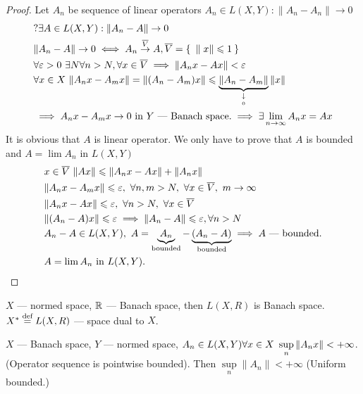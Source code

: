 \begin{proof}
  Let $A_n$ be sequence of linear operators $A_n \in L(X, Y): \|A_n - A_n\| \to 0$
  \begin{align*}
    &?\exists A \in L(X, Y): \|A_n - A\| \to 0 \\
    &\|A_n - A\| \to 0 \iff A_n \overset{\overline{V}}{\rightarrow} A, \overline{V} = \Set{\|x\| \leq
      1}\ \\ 
    &\forall \epsilon > 0\ \exists N \forall n > N, \forall x \in \overline{V}
      \implies \|A_nx - Ax\| < \epsilon \\
    &\forall x \in X\ \|A_nx - A_mx\| = \|(A_n - A_m)x\| \leq \tendsto{\|A_n - A_m\|}{0} \|x\| \\
    & \implies A_nx - A_mx \to 0\ \text{in}\ Y\ \text{--- Banach space}.
      \implies \exists \lim\limits_{n \to \infty}A_nx = Ax
  \end{align*}
  It is obvious that $A$ is linear operator. We only have to prove that $A$ is
  bounded and $A = \lim A_n$ in $L(X, Y)$
  \begin{align*}
    &x \in \overline{V}\ \|Ax\| \leq \|A_nx - Ax\| + \|A_nx\| \\ 
    &\|A_nx - A_mx\| \leq \epsilon,\ \forall n, m > N,\ \forall x \in \overline{V},\ m \to \infty\\
    &\|A_nx - Ax\| \leq \epsilon,\ \forall n > N,\ \forall x \in \overline{V} \\
    &\|(A_n - A)x\| \leq \epsilon \implies \|A_n - A\| \leq \epsilon, \forall n > N \\
    &A_n - A \in L(X, Y),\ A = \underbrace{A_n}_{\text{bounded}} - \underbrace{(A_n -
      A)}_{\text{bounded}} \implies A\ \text{--- bounded}. \\
    &A = \lim A_n\ \text{in}\ L(X, Y). \qedhere
  \end{align*}
\end{proof}

\begin{note}
  $X$ --- normed space, $\R$ --- Banach space, then $L(X, R)$ is Banach space. \\
  $X^{*} \defeq L(X, R)$ --- space dual to $X$.
\end{note}

\begin{thm}
  $X$ --- Banach space, $Y$ --- normed space, $A_n \in L(X, Y)\\ 
  \forall x \in X\ \sup\limits_n\|A_nx\| < +\infty$. (Operator sequence is pointwise
  bounded).
  Then $\sup\limits_n\|A_n\| < +\infty$ (Uniform bounded.)
\end{thm}

